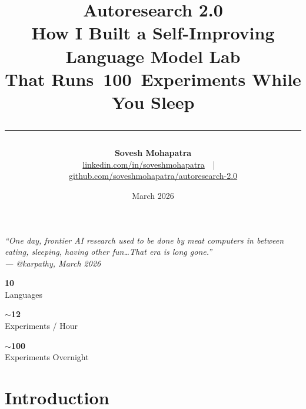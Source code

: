 \documentclass[12pt, a4paper]{article}
\title{%
  {\color{darkbg}\Huge\bfseries Autoresearch 2.0}\\[6pt]
  {\large\color{warmgray} How I Built a Self-Improving Language Model Lab\\
  That Runs~100~Experiments While You Sleep}\\[4pt]
  \rule{\linewidth}{0.6pt}
}
\author{%
  \textbf{Sovesh Mohapatra}\\
  \small\color{warmgray}
  \href{https://www.linkedin.com/in/soveshmohapatra}{linkedin.com/in/soveshmohapatra}~~|~~
  \href{https://github.com/soveshmohapatra/autoresearch-2.0}{github.com/soveshmohapatra/autoresearch-2.0}
}
\date{March 2026}
\begin{document}
\maketitle
\thispagestyle{empty}

\begin{tcolorbox}[callout=brand, halign=center]
\itshape\large
``One day, frontier AI research used to be done by meat computers in between eating, sleeping,
having other fun\ldots That era is long gone.''\\[4pt]
\normalfont\small\color{warmgray}--- @karpathy, March 2026
\end{tcolorbox}

\vspace{8pt}

\noindent
\begin{minipage}[t]{0.32\linewidth}
\begin{tcolorbox}[statcard, halign=center]
  {\fontsize{28}{32}\selectfont\bfseries\color{brand} 10}\\[2pt]
  {\small\color{warmgray} Languages}
\end{tcolorbox}
\end{minipage}\hfill
\begin{minipage}[t]{0.32\linewidth}
\begin{tcolorbox}[statcard, halign=center]
  {\fontsize{28}{32}\selectfont\bfseries\color{brand} $\sim$12}\\[2pt]
  {\small\color{warmgray} Experiments / Hour}
\end{tcolorbox}
\end{minipage}\hfill
\begin{minipage}[t]{0.32\linewidth}
\begin{tcolorbox}[statcard, halign=center]
  {\fontsize{28}{32}\selectfont\bfseries\color{brand} $\sim$100}\\[2pt]
  {\small\color{warmgray} Experiments Overnight}
\end{tcolorbox}
\end{minipage}

\vspace{16pt}
\tableofcontents
\newpage

\section{Introduction}
\end{document}
